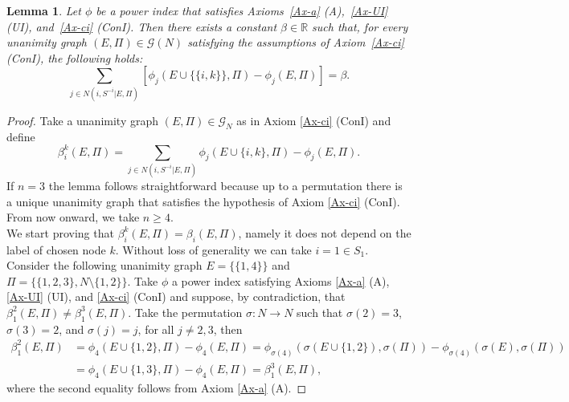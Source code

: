 \documentclass[preprint,11pt,authoryear]{elsarticle}
\theoremstyle{plain}
\newtheorem{lemma}[theorem]{Lemma}
\begin{document}
\begin{lemma}\label{lemma:ConI+A+UI}
	Let $\phi$ be a power index that satisfies Axioms~\ref{Ax-a} (A),~\ref{Ax-UI} (UI), and~\ref{Ax-ci} (ConI).  
	Then there exists a constant $\beta \in \mathbb{R}$ such that, for every unanimity graph $(E, \Pi) \in \mathcal{G}(N)$ satisfying the assumptions of Axiom~\ref{Ax-ci} (ConI), the following holds:
	\begin{equation*}
		\sum_{j \in N(i, S^{-i}|E, \Pi)} \left[ \phi_j(E \cup \{\{i,k\}\}, \Pi) - \phi_j(E, \Pi) \right] = \beta.
	\end{equation*}
\end{lemma}
\begin{proof}
	Take a unanimity graph $(E,\Pi)\in\mathcal{G}_N$ as in Axiom \ref{Ax-ci} (ConI) and define 
	\begin{equation*}
		\beta_i^k(E,\Pi)=  \sum_{j \in N(i, S^{-i}|E, \Pi)} \phi_j(E \cup \{i,k\}, \Pi) -  \phi_j(E, \Pi).
	\end{equation*}
	If $n=3$ the lemma follows straightforward because up to a permutation there is a unique unanimity graph that satisfies the hypothesis of Axiom \ref{Ax-ci} (ConI). From now onward, we take $n\geq4$.   \\
	
	We start proving that $\beta_i^k(E,\Pi)=\beta_i(E,\Pi)$, namely it does not depend on the label of chosen node $k$. 
	Without loss of generality we can take $i=1\in S_1$.  Consider the following unanimity graph $E=\big\{\{1,4\}\big\}$ and $\Pi=\big\{\{1,2,3\},N\setminus\{1,2\}\big\}$. Take $\phi$ a power index satisfying Axioms \ref{Ax-a} (A), \ref{Ax-UI} (UI), and \ref{Ax-ci} (ConI) and suppose, by contradiction, that $\beta_1^2(E,\Pi)\neq \beta_1^3(E,\Pi)$. Take the permutation $\sigma:N\to N$ such that $\sigma(2)=3$, $\sigma(3)=2$, and $\sigma(j)=j$, for all $j\neq 2,3$, then 
	\begin{align*}
		\beta_1^2(E,\Pi)&=\phi_4(E\cup\{1,2\},\Pi)-\phi_4(E,\Pi)=\phi_{\sigma(4)}(\sigma(E\cup\{1,2\}),\sigma(\Pi))-\phi_{\sigma(4)}(\sigma(E),\sigma(\Pi))\\
		&= \phi_4(E\cup\{1,3\},\Pi)-\phi_4(E,\Pi)=\beta_1^3(E,\Pi),
	\end{align*}
	where the second equality follows from Axiom \ref{Ax-a} (A). 
	

\end{proof}
\end{document}
